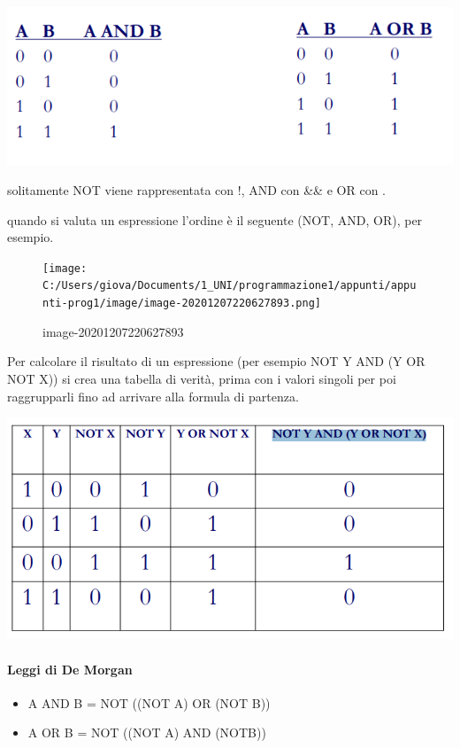 \documentclass[
  paper=a4,
  oneside  ,captions=tableheading
]{scrbook}
\providecommand{\tightlist}{%
  \setlength{\itemsep}{0pt}\setlength{\parskip}{0pt}}
\begin{document}
\includegraphics{./image/image-20201207220252086-1607774220882.png}

solitamente NOT viene rappresentata con !, AND con \&\& e OR con
\textbar\textbar.

quando si valuta un espressione l'ordine è il seguente (NOT, AND, OR),
per esempio.

\begin{figure}
\centering
\texttt{[image: C:/Users/giova/Documents/1\_UNI/programmazione1/appunti/appunti-prog1/image/image-20201207220627893.png]}
\caption{image-20201207220627893}
\end{figure}

Per calcolare il risultato di un espressione (per esempio NOT Y AND (Y
OR NOT X)) si crea una tabella di verità, prima con i valori singoli per
poi raggrupparli fino ad arrivare alla formula di partenza.

\includegraphics{./image/image-20201207220834575.png}

\hypertarget{leggi-di-de-morgan}{%
\paragraph{Leggi di De Morgan}\label{leggi-di-de-morgan}}

\begin{itemize}
\tightlist
\item
  A AND B = NOT ((NOT A) OR (NOT B))
\item
  A OR B = NOT ((NOT A) AND (NOTB))
\end{itemize}
\end{document}
